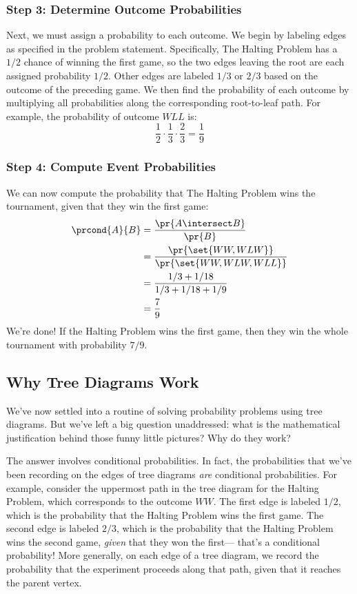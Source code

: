 \subsubsection*{Step 3:  Determine Outcome Probabilities}

Next, we must assign a probability to each outcome.  We begin by
labeling edges as specified in the problem statement.  Specifically,
The Halting Problem has a $1/2$ chance of winning the first game, so
the two edges leaving the root are each assigned probability $1/2$.
Other edges are labeled $1/3$ or $2/3$ based on the outcome of the
preceding game.  We then find the probability of each outcome by
multiplying all probabilities along the corresponding root-to-leaf
path.  For example, the probability of outcome $WLL$ is:
%
\[
\frac{1}{2} \cdot \frac{1}{3} \cdot \frac{2}{3} = \frac{1}{9}
\]

\subsubsection*{Step 4: Compute Event Probabilities}

We can now compute the probability that The Halting Problem wins the
tournament, given that they win the first game:
%
\begin{align*}
\prcond{A}{B}
    & = \frac{\pr{A \intersect B}}{\pr{B}} \\
    & = \frac{\pr{\set{WW, WLW}}}{\pr{\set{WW, WLW, WLL}}} \\
    & = \frac{1/3 + 1/18}{1/3 + 1/18 + 1/9} \\
    & = \frac{7}{9}
\end{align*}
%
We're done!  If the Halting Problem wins the first game, then they win
the whole tournament with probability $7 / 9$.  


\subsection{Why Tree Diagrams Work}\label{product_rule_subsec}

We've now settled into a routine of solving probability problems using
tree diagrams.  But we've left a big question unaddressed: what is the
mathematical justification behind those funny little pictures?  Why do
they work?

The answer involves conditional probabilities.  In fact, the
probabilities that we've been recording on the edges of tree diagrams
\textit{are} conditional probabilities.  For example, consider the
uppermost path in the tree diagram for the Halting Problem, which
corresponds to the outcome $WW$.  The first edge is labeled $1/2$,
which is the probability that the Halting Problem wins the first game.
The second edge is labeled $2 / 3$, which is the probability that the
Halting Problem wins the second game, \textit{given} that they won the
first--- that's a conditional probability!  More generally, on each
edge of a tree diagram, we record the probability that the experiment
proceeds along that path, given that it reaches the parent vertex.

